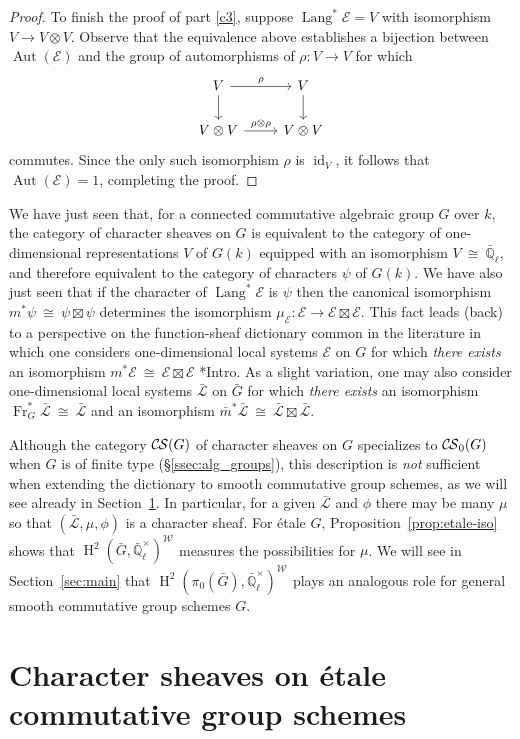 \documentclass[10pt]{amsart}
\theoremstyle{plain}
\theoremstyle{definition}
\newcommand{\EE}{\mathbb{\bar Q}_\ell}
\newcommand{\Fq}{k}
\newcommand{\EEx}{\EE^\times}
\newcommand{\Weil}[1]{\mathcal{W}_{#1}}
\newcommand{\Frob}[1]{\operatorname{Fr}_{#1}}
\DeclareMathOperator{\Aut}{Aut}
\DeclareMathOperator{\id}{id}
\DeclareMathOperator{\Hh}{H}
\DeclareMathOperator{\Lang}{Lang}
\newcommand{\iso}{{\ \cong\ }}
\newcommand{\cs}[1]{{\mathcal{#1}}}
\newcommand{\gcs}[1]{{\mathcal{\bar #1}}}
\newcommand{\CS}{{\mathcal{C\hskip-0.8pt S}}}
\newcommand{\bCS}{{\CS_0}}
\newcommand{\bm}{\bar{m}}
\newcommand{\bG}{\bar{G}}
\begin{document}
\begin{proof}
To finish the proof of part \ref{c3}, suppose $\Lang^*\cs{E} = V$ with isomorphism $V \to V\otimes V$.
Observe that the equivalence above establishes a bijection between $\Aut(\cs{E})$ and the group of automorphisms of $\rho : V\to V$ for which 
\[
\begin{tikzcd}
\arrow{d}{} V \arrow{r}{\rho} & V\arrow{d}{}\\
V\otimes V \arrow{r}{\rho\otimes \rho} & V\otimes V
\end{tikzcd}
\]
commutes. 
Since the only such isomorphism $\rho$ is $\id_V$, it follows that $\Aut(\cs{E}) = 1$, completing the proof.
\end{proof}

We have just seen that, for a connected commutative algebraic group $G$ over $\Fq$, the category of character sheaves
on $G$ is equivalent to the category of one-dimensional representations $V$ of $G(\Fq)$ equipped with an isomorphism
$V\iso \EE$, and therefore equivalent to the category of characters $\psi$ of $G(\Fq)$.
We have also just seen that if the character of $\Lang^*\cs{E}$ is $\psi$ then the canonical isomorphism
$m^*\psi \iso \psi \boxtimes \psi$ determines the isomorphism $\mu_\cs{E} : \cs{E} \to \cs{E}\boxtimes\cs{E}$.
This fact leads (back) to a perspective on the function-sheaf dictionary common in the literature in which one considers
one-dimensional local systems $\cs{E}$ on $G$ for which \emph{there exists} an isomorphism
$m^*\cs{E} \iso \cs{E} \boxtimes\cs{E}$ \cite{kamgarpour:09a}*{Intro}.
As a slight variation, one may also consider one-dimensional local systems $\gcs{L}$ on $\bG$ for which \emph{there exists}
an isomorphism $\Frob{G}^*\gcs{L} \iso \gcs{L}$ and an isomorphism $\bm^*\gcs{L} \iso \gcs{L} \boxtimes\gcs{L}$.

Although the category $\CS(G)$ of character sheaves on $G$ specializes to $\bCS(G)$ when $G$ is of finite type
(\S \ref{ssec:alg_groups}), this description is \emph{not} sufficient when extending the dictionary to smooth
commutative group schemes, as we will see already in Section~\ref{sec:etale}.
In particular, for a given $\gcs{L}$ and $\phi$ there may be many $\mu$ so that $(\gcs{L},\mu,\phi)$ is a character sheaf.
For \'etale $G$, Proposition~\ref{prop:etale-iso} shows that $\Hh^2(\bG,\EEx)^{\Weil{}}$ measures the possibilities for $\mu$.
We will see in Section~\ref{sec:main} that $\Hh^2(\pi_0(\bG),\EEx)^{\Weil{}}$ plays an analogous role for general
smooth commutative group schemes $G$.

\section{Character sheaves on \'etale commutative group schemes} \label{sec:etale}
\end{document}
